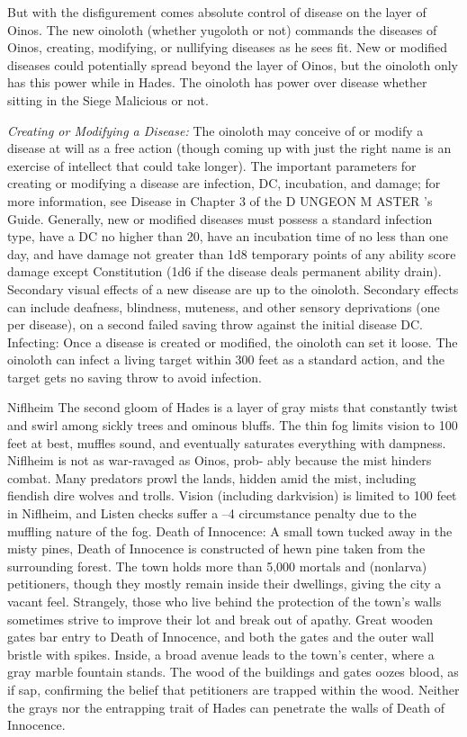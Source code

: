 But with the disfigurement comes absolute control of disease on the layer of Oinos. The new oinoloth (whether yugoloth or not) commands the diseases of Oinos, creating, modifying, or nullifying diseases as he sees fit. New or modified diseases could potentially spread beyond the layer of Oinos, but the oinoloth only has this power while in Hades. The oinoloth has power over disease whether sitting in the Siege Malicious or not.

\textit{Creating or Modifying a Disease:} The oinoloth may conceive of or modify a disease at will as a free action (though
coming up with just the right name is an exercise of
intellect that could take longer). The important parameters
for creating or modifying a disease are infection, DC,
incubation, and damage; for more information, see Disease
in Chapter 3 of the D UNGEON M ASTER ’s Guide.
Generally, new or modified diseases must possess a
standard infection type, have a DC no higher than 20, have
an incubation time of no less than one day, and have
damage not greater than 1d8 temporary points of any
ability score damage except Constitution (1d6 if the
disease deals permanent ability drain). Secondary visual
effects of a new disease are up to the oinoloth. Secondary
effects can include deafness, blindness, muteness, and
other sensory deprivations (one per disease), on a second
failed saving throw against the initial disease DC.
Infecting: Once a disease is created or modified, the
oinoloth can set it loose. The oinoloth can infect a living
target within 300 feet as a standard action, and the target
gets no saving throw to avoid infection.

Niflheim
The second gloom of Hades is a layer of gray mists that
constantly twist and swirl among sickly trees and ominous
bluffs. The thin fog limits vision to 100 feet at best, muffles
sound, and eventually saturates everything with
dampness. Niflheim is not as war-ravaged as Oinos, prob-
ably because the mist hinders combat. Many predators
prowl the lands, hidden amid the mist, including fiendish
dire wolves and trolls.
Vision (including darkvision) is limited to 100 feet in
Niflheim, and Listen checks suffer a –4 circumstance
penalty due to the muffling nature of the fog.
Death of Innocence: A small town tucked away in the
misty pines, Death of Innocence is constructed of hewn
pine taken from the surrounding forest.
The town holds more than 5,000 mortals and (nonlarva)
petitioners, though they mostly remain inside their
dwellings, giving the city a vacant feel. Strangely, those
who live behind the protection of the town's walls
sometimes strive to improve their lot and break out of
apathy.
Great wooden gates bar entry to Death of Innocence,
and both the gates and the outer wall bristle with spikes.
Inside, a broad avenue leads to the town's center, where a
gray marble fountain stands. The wood of the buildings
and gates oozes blood, as if sap, confirming the belief that
petitioners are trapped within the wood. Neither the grays
nor the entrapping trait of Hades can penetrate the walls
of Death of Innocence.

